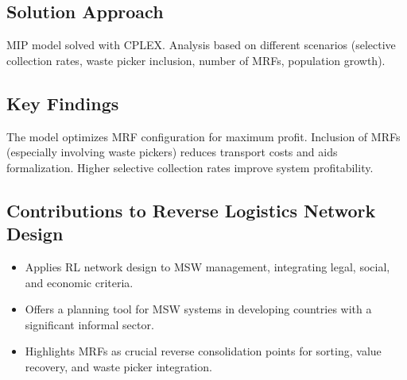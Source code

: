\subsection*{Solution Approach}
MIP model solved with CPLEX. Analysis based on different scenarios (selective collection rates, waste picker inclusion, number of MRFs, population growth).

\subsection*{Key Findings}
The model optimizes MRF configuration for maximum profit. Inclusion of MRFs (especially involving waste pickers) reduces transport costs and aids formalization. Higher selective collection rates improve system profitability.

\subsection*{Contributions to Reverse Logistics Network Design}
\begin{itemize}
    \item Applies RL network design to MSW management, integrating legal, social, and economic criteria.
    \item Offers a planning tool for MSW systems in developing countries with a significant informal sector.
    \item Highlights MRFs as crucial reverse consolidation points for sorting, value recovery, and waste picker integration.
\end{itemize}